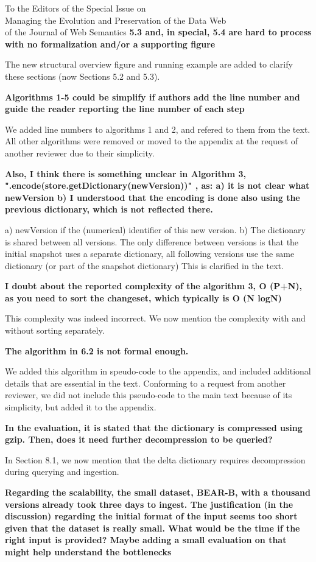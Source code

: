 \documentclass{letter}
\newcounter{section}
\begin{document}
\begin{letter}{To the Editors of the Special Issue on\\Managing the Evolution and Preservation of the Data Web\\of the Journal of Web Semantics}
\textbf{5.3 and, in special, 5.4 are hard to process with no formalization and/or a supporting figure}

The new structural overview figure and running example are added to clarify these sections (now Sections 5.2 and 5.3).

\textbf{Algorithms 1-5 could be simplify if authors add the line number and guide the reader reporting the line number of each step}

We added line numbers to algorithms 1 and 2, and refered to them from the text.
All other algorithms were removed or moved to the appendix at the request of another reviewer due to their simplicity.

\textbf{Also, I think there is something unclear in Algorithm 3, ".encode(store.getDictionary(newVersion))" , as: a) it is not clear what newVersion b) I understood that the encoding is done also using the previous dictionary, which is not reflected there.}

a) newVersion if the (numerical) identifier of this new version.
b) The dictionary is shared between all versions. The only difference between versions is that the initial snapshot uses a separate dictionary, all following versions use the same dictionary (or part of the snapshot dictionary)
This is clarified in the text.

\textbf{I doubt about the reported complexity of the algorithm 3, O (P+N), as you need to sort the changeset, which typically is O (N logN)}

This complexity was indeed incorrect. We now mention the complexity with and without sorting separately.

\textbf{The algorithm in 6.2 is not formal enough.}

We added this algorithm in speudo-code to the appendix,
and included additional details that are essential in the text.
Conforming to a request from another reviewer, we did not include this pseudo-code to the main text because of its simplicity,
but added it to the appendix.

\textbf{In the evaluation, it is stated that the dictionary is compressed using gzip. Then, does it need further decompression to be queried?}

In Section 8.1, we now mention that the delta dictionary requires decompression during querying and ingestion.

\textbf{Regarding the scalability, the small dataset, BEAR-B, with a thousand versions already took three days to ingest. The justification (in the discussion) regarding the initial format of the input seems too short given that the dataset is really small. What would be the time if the right input is provided? Maybe adding a small evaluation on that might help understand the bottlenecks}


\end{letter}
\end{document}
